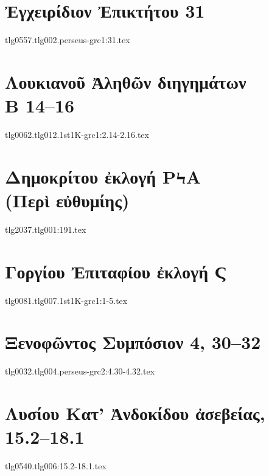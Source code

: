 \documentclass[a4paper,12pt,twoside]{report}
\begin{document}
\chapter[Ἐγχειρίδιον Ἐπικτήτου 31]{\textgreek[variant=ancient]{Ἐγχειρίδιον Ἐπικτήτου} 31}

{tlg0557.tlg002.perseus-grc1:31.tex}


\chapter[Λουκιανοῦ Ἀληθῶν διηγημάτων Β]{\textgreek[variant=ancient]{Λουκιανοῦ Ἀληθῶν διηγημάτων \\Β} 14–16}

{tlg0062.tlg012.1st1K-grc1:2.14-2.16.tex}


\chapter[Δημοκρίτου ἐκλογή ΡϞΑ]{\textgreek[variant=ancient]{Δημοκρίτου ἐκλογή ΡϞΑ \\(Περὶ εὐθυμίης)}}

{tlg2037.tlg001:191.tex}




\chapter[Γοργίου Ἐπιτάφιος]{\textgreek[variant=ancient]{Γοργίου Ἐπιταφίου ἐκλογή Ϛ}}
\label{chap:gorgias}

{tlg0081.tlg007.1st1K-grc1:1-5.tex}


\chapter[Ξενοφῶντος Συμπόσιον]{\textgreek[variant=ancient]{Ξενοφῶντος Συμπόσιον} 4, 30–32}

{tlg0032.tlg004.perseus-grc2:4.30-4.32.tex}


\chapter[Λυσίου Κατ' Ἀνδοκίδου ἀσεβείας]{\textgreek[variant=ancient]{Λυσίου Κατ' Ἀνδοκίδου ἀσεβείας,} 15.2–18.1}

{tlg0540.tlg006:15.2-18.1.tex}




\end{document}
